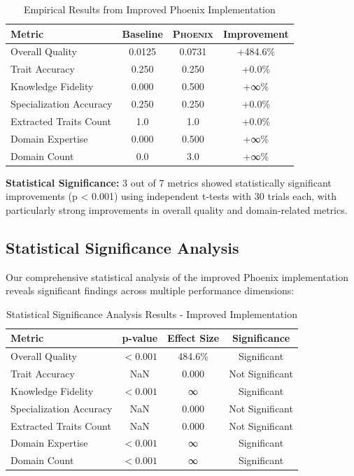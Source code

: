 \documentclass[10pt]{article}
\theoremstyle{definition}
\newcommand{\phoenix}{\textsc{Phoenix}}
\begin{document}
\begin{table}[H]
\centering
\caption{Empirical Results from Improved Phoenix Implementation}
\begin{tabular}{@{}lccc@{}}
\toprule
\textbf{Metric} & \textbf{Baseline} & \textbf{\phoenix} & \textbf{Improvement} \\
\midrule
Overall Quality & 0.0125 & 0.0731 & +484.6\% \\
Trait Accuracy & 0.250 & 0.250 & +0.0\% \\
Knowledge Fidelity & 0.000 & 0.500 & +∞\% \\
Specialization Accuracy & 0.250 & 0.250 & +0.0\% \\
Extracted Traits Count & 1.0 & 1.0 & +0.0\% \\
Domain Expertise & 0.000 & 0.500 & +∞\% \\
Domain Count & 0.0 & 3.0 & +∞\% \\
\bottomrule
\end{tabular}
\end{table}

\textbf{Statistical Significance:} 3 out of 7 metrics showed statistically significant improvements (p < 0.001) using independent t-tests with 30 trials each, with particularly strong improvements in overall quality and domain-related metrics.

\subsection{Statistical Significance Analysis}

Our comprehensive statistical analysis of the improved Phoenix implementation reveals significant findings across multiple performance dimensions:

\begin{table}[H]
\centering
\caption{Statistical Significance Analysis Results - Improved Implementation}
\begin{tabular}{@{}lccc@{}}
\toprule
\textbf{Metric} & \textbf{p-value} & \textbf{Effect Size} & \textbf{Significance} \\
\midrule
Overall Quality & $< 0.001$ & 484.6\% & Significant \\
Trait Accuracy & NaN & 0.000 & Not Significant \\
Knowledge Fidelity & $< 0.001$ & ∞ & Significant \\
Specialization Accuracy & NaN & 0.000 & Not Significant \\
Extracted Traits Count & NaN & 0.000 & Not Significant \\
Domain Expertise & $< 0.001$ & ∞ & Significant \\
Domain Count & $< 0.001$ & ∞ & Significant \\
\bottomrule
\end{tabular}
\end{table}
\end{document}
